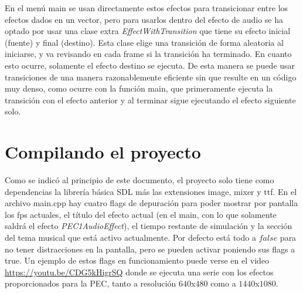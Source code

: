 \documentclass[12pt]{article}%
\begin{document}
	En el menú main se usan directamente estos efectos para transicionar entre los efectos dados en un vector, pero para usarlos dentro del efecto de audio se ha optado por usar una clase extra \textit{EffectWithTransition} que tiene su efecto inicial (fuente) y final (destino). Esta clase elige una transición de forma aleatoria al iniciarse, y va revisando en cada frame si la transición ha terminado. En cuanto esto ocurre, solamente el efecto destino se ejecuta. De esta manera se puede usar transiciones de una manera razonablemente eficiente sin que resulte en un código muy denso, como ocurre con la función main, que primeramente ejecuta la transición con el efecto anterior y al terminar sigue ejecutando el efecto siguiente solo.
	
\section{Compilando el proyecto}
	Como se indicó al principio de este documento, el proyecto solo tiene como dependencias la librería básica SDL más las extensiones image, mixer y ttf. En el archivo main.cpp hay cuatro flags de depuración para poder mostrar por pantalla los fps actuales, el título del efecto actual (en el main, con lo que solamente saldrá el efecto \textit{PEC1AudioEffect}), el tiempo restante de simulación y la sección del tema musical que está activo actualmente. Por defecto está todo a $false$ para no tener distracciones en la pantalla, pero se pueden activar poniendo sus flags a true. Un ejemplo de estos flags en funcionamiento puede verse en el video \url{https://youtu.be/CDG5kHigrSQ} donde se ejecuta una serie con los efectos proporcionados para la PEC, tanto a resolución $640$x$480$ como a $1440$x$1080$.
	
\end{document}
